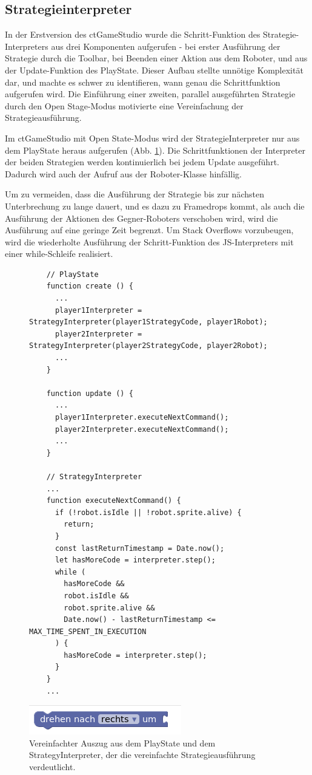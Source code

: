 \subsection{Strategieinterpreter}

In der Erstversion des ctGameStudio wurde die Schritt-Funktion des Strategie-Interpreters aus drei Komponenten
aufgerufen - bei erster Ausführung der Strategie durch die Toolbar, bei Beenden einer Aktion aus dem
Roboter, und aus der Update-Funktion des PlayState. Dieser Aufbau stellte unnötige Komplexität dar,
und machte es schwer zu identifieren, wann genau die Schrittfunktion aufgerufen wird. Die Einführung
einer zweiten, parallel ausgeführten Strategie durch den Open Stage-Modus motivierte eine
Vereinfachung der Strategieausführung.

Im ctGameStudio mit Open State-Modus wird der StrategieInterpreter nur aus dem PlayState heraus
aufgerufen (Abb. \ref{strategy-interpreter-new}). Die Schrittfunktionen der Interpreter der beiden
Strategien werden kontinuierlich bei jedem Update ausgeführt. Dadurch wird auch der Aufruf aus der
Roboter-Klasse hinfällig.

Um zu vermeiden, dass die Ausführung der Strategie bis zur nächsten Unterbrechung zu lange dauert,
und es dazu zu Framedrops kommt, als auch die Ausführung der Aktionen des Gegner-Roboters verschoben
wird, wird die Ausführung auf eine geringe Zeit begrenzt. Um Stack Overflows vorzubeugen, wird die
wiederholte Ausführung der Schritt-Funktion des JS-Interpreters mit einer while-Schleife realisiert.


\begin{figure}
  \label{strategy-interpreter-new}

  \caption{Vereinfachter Auszug aus dem PlayState und dem StrategyInterpreter, der die vereinfachte
  Strategieausführung verdeutlicht.}

  \begin{lstlisting}
    // PlayState
    function create () {
      ...
      player1Interpreter = StrategyInterpreter(player1StrategyCode, player1Robot);
      player2Interpreter = StrategyInterpreter(player2StrategyCode, player2Robot);
      ...
    }

    function update () {
      ...
      player1Interpreter.executeNextCommand();
      player2Interpreter.executeNextCommand();
      ...
    }

    // StrategyInterpreter
    ...
    function executeNextCommand() {
      if (!robot.isIdle || !robot.sprite.alive) {
        return;
      }
      const lastReturnTimestamp = Date.now();
      let hasMoreCode = interpreter.step();
      while (
        hasMoreCode &&
        robot.isIdle &&
        robot.sprite.alive &&
        Date.now() - lastReturnTimestamp <= MAX_TIME_SPENT_IN_EXECUTION
      ) {
        hasMoreCode = interpreter.step();
      }
    }
    ...
  \end{lstlisting}

  \includegraphics{figures/blockly_configuration_turn.png}
\end{figure}


